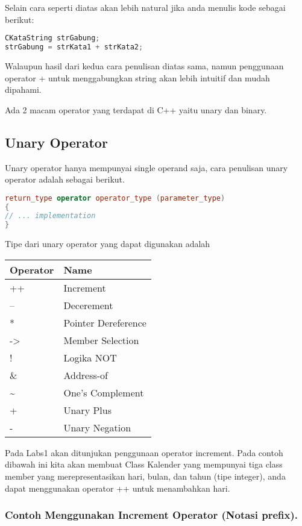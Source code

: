 Selain cara seperti diatas akan lebih natural jika anda menulis kode
sebagai berikut:

\begin{lstlisting}[language=c++, numbers=none]
CKataString strGabung;
strGabung = strKata1 + strKata2;
\end{lstlisting}

Walaupun hasil dari kedua cara penulisan diatas sama, namun penggunaan
operator + untuk menggabungkan string akan lebih intuitif dan mudah
dipahami.

Ada 2 macam operator yang terdapat di C++ yaitu unary dan binary.

\subsection{Unary Operator}\label{unary-operator}

Unary operator hanya mempunyai single operand saja, cara penulisan unary
operator adalah sebagai berikut.

\begin{lstlisting}[language=c++, numbers=none]
return_type operator operator_type (parameter_type)
{
// ... implementation
}
\end{lstlisting}

Tipe dari unary operator yang dapat digunakan adalah

\begin{longtable}[]{@{}ll@{}}
\toprule
Operator & Name\tabularnewline
\midrule
\endhead
++ & Increment\tabularnewline
-- & Decerement\tabularnewline
* & Pointer Dereference\tabularnewline
-\textgreater{} & Member Selection\tabularnewline
! & Logika NOT\tabularnewline
\& & Address-of\tabularnewline
\textasciitilde{} & One's Complement\tabularnewline
+ & Unary Plus\tabularnewline
- & Unary Negation\tabularnewline
\bottomrule
\end{longtable}

Pada Labs1 akan ditunjukan penggunaan operator increment. Pada contoh
dibawah ini kita akan membuat Class Kalender yang mempunyai tiga class
member yang merepresentasikan hari, bulan, dan tahun (tipe integer),
anda dapat menggunakan operator ++ untuk menambahkan hari.

\subsubsection*{Contoh  Menggunakan Increment Operator (Notasi prefix).}

